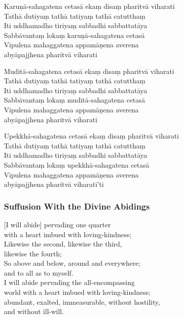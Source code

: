 Karuṇā-sahagatena cetasā ekaṃ disaṃ pharitvā viharati\\
Tathā dutiyaṃ tathā tatiyaṃ tathā catutthaṃ\\
Iti uddhamadho tiriyaṃ sabbadhi sabbattatāya\\
Sabbāvantaṃ lokaṃ karuṇā-sahagatena cetasā\\
Vipulena mahaggatena appamāṇena averena\\
abyāpajjhena pharitvā viharati

Muditā-sahagatena cetasā ekaṃ disaṃ pharitvā viharati\\
Tathā dutiyaṃ tathā tatiyaṃ tathā catutthaṃ\\
Iti uddhamadho tiriyaṃ sabbadhi sabbattatāya\\
Sabbāvantaṃ lokaṃ muditā-sahagatena cetasā\\
Vipulena mahaggatena appamāṇena averena\\
abyāpajjhena pharitvā viharati

\clearpage

Upekkhā-sahagatena cetasā ekaṃ disaṃ pharitvā viharati\\
Tathā dutiyaṃ tathā tatiyaṃ tathā catutthaṃ\\
Iti uddhamadho tiriyaṃ sabbadhi sabbattatāya\\
Sabbāvantaṃ lokaṃ upekkhā-sahagatena cetasā\\
Vipulena mahaggatena appamāṇena averena\\
abyāpajjhena pharitvā viharatī'ti 

\subsubsection{Suffusion With the Divine Abidings}


\smallskip

\begin{leader}
\end{leader}

[I will abide] pervading one quarter\\
with a heart imbued with loving-kindness;\\
Likewise the second, likewise the third,\\ likewise the fourth;\\
So above and below, around and everywhere;\\ and to all as to myself.\\
I will abide pervading the all-encompassing\\
world with a heart imbued with loving-kindness;\\
abundant, exalted, immeasurable, without hostility,\\
and without ill-will.


